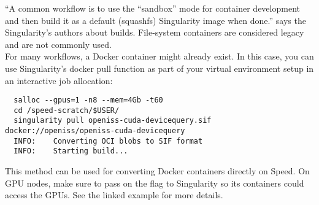 \noindent
``A common workflow is to use the ``sandbox'' mode for container development and then build it as a 
default (squashfs) Singularity image when done.'' says the Singularity's authors about builds.
File-system containers are considered legacy and are not commonly used.\\

For many workflows, a Docker container might already exist. In this case, you can use Singularity's 
docker pull function as part of your virtual environment setup in an interactive job allocation:

\small
\begin{verbatim}
  salloc --gpus=1 -n8 --mem=4Gb -t60
  cd /speed-scratch/$USER/
  singularity pull openiss-cuda-devicequery.sif docker://openiss/openiss-cuda-devicequery
  INFO:    Converting OCI blobs to SIF format
  INFO:    Starting build...
\end{verbatim}
\normalsize

\noindent
This method can be used for converting Docker containers directly on Speed.
On GPU nodes, make sure to pass on the  flag to Singularity so its containers 
could access the GPUs. See the linked example for more details.
